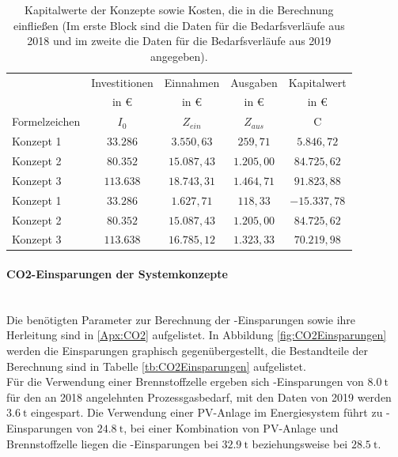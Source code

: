 \begin{table}[htb]
		\centering
		\caption{Kapitalwerte der Konzepte sowie Kosten, die in die Berechnung einfließen (Im erste Block sind die Daten für die Bedarfsverläufe aus 2018 und im zweite die Daten für die Bedarfsverläufe aus 2019 angegeben).}
		\begin{tabular}{l c c c c}
		\toprule
		 & Investitionen & Einnahmen & Ausgaben & Kapitalwert\\
		& in € & in € & in € & in €\\
		Formelzeichen & $I_0$ & $Z_{ein}$ & $Z_{aus}$ & C\\
		\midrule
		Konzept 1 & $ 33.286$ & $ 3.550,63$ & $  259,71$ & $ 5.846,72$\\
		Konzept 2 & $ 80.352$ & $15.087,43$ & $1.205,00$ & $84.725,62$\\
		Konzept 3 & $113.638$ & $18.743,31$ & $1.464,71$ & $91.823,88$\\
		\midrule
		Konzept 1 & $ 33.286$ & $ 1.627,71$ & $  118,33$ & $-15.337,78$\\
		Konzept 2 & $ 80.352$ & $15.087,43$ & $1.205,00$ & $ 84.725,62$\\
		Konzept 3 & $113.638$ & $16.785,12$ & $1.323,33$ & $ 70.219,98$\\
		\bottomrule
		\end{tabular}
		\label{tb:Kapitalwerte}
\end{table}	

\FloatBarrier

\paragraph{CO2-Einsparungen der Systemkonzepte}\ \\
Die benötigten Parameter zur Berechnung der -Einsparungen sowie ihre Herleitung sind in \ref{Apx:CO2} aufgelistet. In Abbildung \ref{fig:CO2Einsparungen} werden die Einsparungen graphisch gegenübergestellt, die Bestandteile der Berechnung sind in Tabelle \ref{tb:CO2Einsparungen} aufgelistet.\\

Für die Verwendung einer Brennstoffzelle ergeben sich -Einsparungen von $\SI{8,0}{\tonne}$ für den an 2018 angelehnten Prozessgasbedarf, mit den Daten von 2019 werden $\SI{3,6}{\tonne}$  eingespart. Die Verwendung einer PV-Anlage im Energiesystem führt zu -Einsparungen von $\SI{24,8}{\tonne}$, bei einer Kombination von PV-Anlage und Brennstoffzelle liegen die -Einsparungen bei $\SI{32,9}{\tonne}$ beziehungsweise bei $\SI{28,5}{\tonne}$.\\

